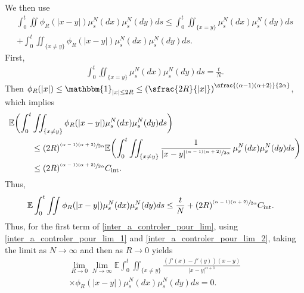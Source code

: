 \documentclass[10pt]{amsart}
\let\mathds\mathbbm
\newcommand{\rint}{\mathrm{int}}
\theoremstyle{plain}
\theoremstyle{definition}
\begin{document}
We then use
\begin{multline*}
\int_{0}^t\iint\phi_R(|x-y|)\mu^N_s(dx)\mu^N_s(dy)ds
\leq \int_{0}^t\iint_{\{x=y\}}\mu^N_s(dx)\mu^N_s(dy)ds\\
+\int_{0}^t\iint_{\{x\neq y\}}\phi_R(|x-y|)\mu^N_s(dx)\mu^N_s(dy)ds.
\end{multline*}
First,
\begin{align*}
\int_{0}^t\iint_{\{x=y\}}\mu^N_s(dx)\mu^N_s(dy)ds=\frac{t}{N}.
\end{align*}
Then $\phi_R(|x|)\leq \mathds{1}_{|x|\leq2R}\leq\left(\sfrac{2R}{|x|}\right)^{\sfrac{(\alpha-1)(\alpha+2)}{2\alpha}}$,
which implies
\begin{align*}
\mathbb{E}\biggl(\int_{0}^t&\iint_{\{x\neq y\}}\phi_R(|x-y|)\mu^N_s(dx)\mu^N_s(dy)ds\biggr)\\
&\leq(2R)^{\sfrac{(\alpha-1)(\alpha+2)}{2\alpha}}\mathbb{E}\biggl(\int_{0}^t\iint_{\{x\neq y\}}\frac{1}{|x-y|^{\sfrac{(\alpha-1)(\alpha+2)}{2\alpha}}}\,\mu^N_s(dx)\mu^N_s(dy)ds\biggr)\\
&\leq (2R)^{\sfrac{(\alpha-1)(\alpha+2)}{2\alpha}}C_{\rint}.
\end{align*}
Thus,
\begin{align}
\mathbb{E}\int_{0}^t\iint\phi_R(|x-y|)\mu^N_s(dx)\mu^N_s(dy)ds&\leq \frac{t}{N}+(2R)^{\sfrac{(\alpha-1)(\alpha+2)}{2\alpha}}C_{\rint}\label{inter_a_controler_pour_lim_2}.
\end{align}
Thus, for the first term of \eqref{inter_a_controler_pour_lim}, using \eqref{inter_a_controler_pour_lim_1} and \eqref{inter_a_controler_pour_lim_2}, taking the limit as $N\to\infty$ and then as $R\to0$ yields
\begin{multline}\label{I_4_terme1}
\lim_{R\to0}\lim_{N\to\infty}
\mathbb{E}\int_{0}^t\iint_{\{x\neq y\}}\frac{(f'(x)-f'(y))(x-y)}{|x-y|^{\alpha+1}}\\
\times\phi_R(|x-y|)\mu^N_s(dx)\mu^N_s(dy)ds=0.
\end{multline}
\end{document}
